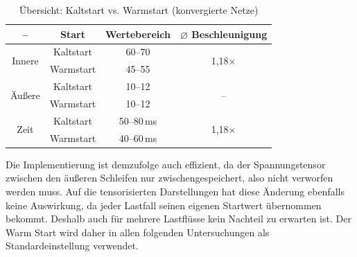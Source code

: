 \begin{table}[htbp]
		\caption{Übersicht: Kaltstart vs. Warmstart (konvergierte Netze)}
	\label{tab:kalt_warm_uebersicht}
	\centering
	\begin{tabular}{c|c|c|c}
		\hline
		\textbf{--} & \textbf{Start} & \textbf{Wertebereich} & \textbf{$\diameter$ Beschleunigung} \\
		\hline
		\multirow{2}{*}{Innere}
		& Kaltstart & 60--70 & \multirow{2}{*}{1,18$\times$} \\
		& Warmstart & 45--55 & \\
		\hline
		\multirow{2}{*}{Äußere}
		& Kaltstart & 10--12 & \multirow{2}{*}{--} \\
		& Warmstart & 10--12 & \\
		\hline
		\multirow{2}{*}{Zeit}
		& Kaltstart & 50--80\,ms & \multirow{2}{*}{1,18$\times$} \\
		& Warmstart & 40--60\,ms & \\
		\hline
	\end{tabular}

\end{table}







Die Implementierung ist demzufolge auch effizient, da der Spannungstensor zwischen den äußeren Schleifen nur zwischengespeichert, also nicht verworfen werden muss.
Auf die tensorisierten Darstellungen hat diese Änderung ebenfalls keine Auswirkung, da jeder Lastfall seinen eigenen Startwert übernommen bekommt.
Deshalb auch für mehrere Lastflüsse kein Nachteil zu erwarten ist.
Der Warm Start wird daher in allen folgenden Untersuchungen als
Standardeinstellung verwendet.\\


